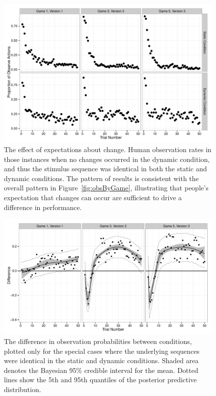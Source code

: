 \documentclass[authoryear]{elsarticle}
\begin{document}
\begin{figure}[p]
\begin{center}
\includegraphics[scale=.5]{dataSpecialCases.pdf}
\caption{The effect of expectations about change. Human observation rates in those instances when no changes occurred in the dynamic condition, and thus the stimulus sequence was identical in both the static and dynamic conditions. The pattern of results is consistent with the overall pattern in Figure~\protect\ref{fig:obsByGame}, illustrating that people's expectation that changes can occur are sufficient to drive a difference in performance.}
\label{fig:obsSpecial}
\end{center}
\end{figure}


\begin{figure}[p]
\begin{center}
\includegraphics[scale=.5]{allDiffs.pdf}
\caption{The difference in observation probabilities between conditions, plotted only for the special cases where the underlying sequences were identical in the static and dynamic conditions. Shaded area denotes the Bayesian 95\% credible interval for the mean. Dotted lines show the 5th and 95th quantiles of the posterior predictive distribution.}
\label{fig:diffSpecial}
\end{center}
\end{figure}
\end{document}
